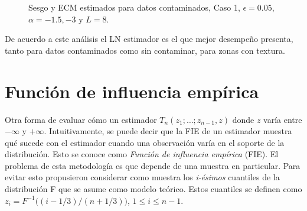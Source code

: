 \begin{figure}[htb]
	\caption{\label{SesgoyECMConContL=8-1punto5y-3}\small Sesgo y ECM estimados para datos contaminados, Caso 1, $\epsilon=0.05$, $\alpha=-1.5, -3$ y $ L=8$.}
\end{figure}
De acuerdo a este análisis el LN estimador es el que mejor desempeño presenta, tanto para datos contaminados como sin contaminar, para zonas con textura.

\section{Función de influencia empírica}
\label{FIES}

Otra forma de evaluar cómo un estimador $T_n(z_1; \ldots ; z_{n-1},z)$ donde $z$ varía entre $-\infty$ y $+\infty$. Intuitivamente, se puede decir que la FIE de un estimador muestra qué sucede con el estimador cuando una observación varía en el soporte de la distribución. Esto se conoce como \textit{Función de influencia empírica} (FIE). El problema de esta metodología es que depende de una muestra en particular. Para evitar esto \citet{Andrews1972} propusieron considerar como muestra los \textit{i-ésimos} cuantiles de la distribución F que se asume como modelo teórico. Estos cuantiles se definen como $z_i=F^{-1}\big((i-1/3)/(n+1/3) \big)$, $1\leq i\leq n-1$.

